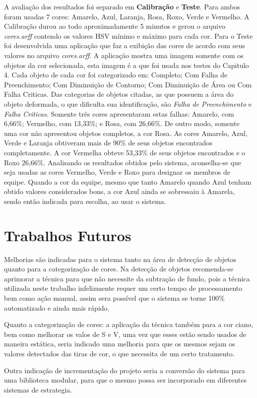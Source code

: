 A avaliação dos resultados foi separado em \textbf{Calibração} e \textbf{Teste}. Para ambos foram usadas 7 cores: Amarelo, Azul, Laranja, Rosa, Roxo, Verde e Vermelho. A Calibração durou ao todo aproximadamente 5 minutos e gerou o arquivo \textit{cores.arff} contendo os valores HSV mínimo e máximo para cada cor. Para o Teste foi desenvolvida uma aplicação que faz a exibição das cores de acordo com seus valores no arquivo \textit{cores.arff}. A aplicação mostra uma imagem somente com os objetos da cor selecionada, esta imagem é a que foi usada nos testes do Capitulo 4. Cada objeto de cada cor foi categorizado em: Completo; Com Falha de Preenchimento; Com Diminuição de Contorno; Com Diminuição de Área ou Com Falha Criticas. Das categorias de objetos citadas, as que possuem a área do objeto deformada, o que dificulta sua identificação, são \textit{Falha de Preenchimento} e \textit{Falha Criticas}. Somente tr\^{e}s cores apresentaram estas falhas: Amarelo, com 6,66\%; Vermelho, com 13,33\%; e Rosa, com 26,66\%. De outro modo, somente uma cor não apresentou objetos completos, a cor Rosa. As cores Amarelo, Azul, Verde e Laranja obtiveram mais de 90\% de seus objetos encontrados completamente. A cor Vermelha obteve 53,33\% de seus objetos encontrados e o Roxo 26,66\%. 
Analisando os resultados obtidos pelo sistema, aconselha-se que seja usadas as cores Vermelho, Verde e Roxo para designar os membros de equipe. Quando a cor da equipe, mesmo que tanto Amarelo quando Azul tenham obtido valores considerados bons, a cor Azul ainda se sobressaiu à Amarela, sendo então indicada para escolha, ao usar o sistema. 

\section{Trabalhos Futuros}
Melhorias são indicadas para o sistema tanto na área de detecção de objetos quanto para a categorização de cores. Na detecção de objetos recomenda-se aprimorar a técnica para que não necessite da subtração de fundo, pois a técnica utilizada neste trabalho infelizmente requer um certo tempo de processamento bem como ação manual, assim sera possível que o sistema se torne 100\% automatizado e ainda mais rápido.

 Quanto a categorização de cores: a aplicação da técnica também para a cor ciano, bem como melhorar os valos de S e V, uma vez que esses estão sendo usados de maneira estática, seria indicado uma melhoria para que os mesmos sejam os valores detectados das tiras de cor, o que necessita de um certo tratamento.
 
Outra indicação de incrementação do projeto seria a conversão do sistema para uma biblioteca modular, para que o mesmo possa ser incorporado em diferentes sistemas de estrategia. 
